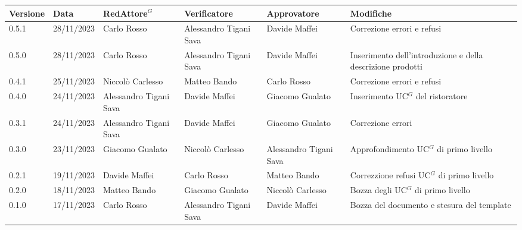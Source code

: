 \begin{table}[H]
	\centering
	\fontsize{10}{12}\selectfont
	\begin{tabularx}{\textwidth}{X|X|X|X|X|X}
		\textbf{Versione}     & \textbf{Data}        & \textbf{Red\gls{Attore}$^G$}     &
		\textbf{Verificatore} & \textbf{Approvatore} & \textbf{Modifiche}                                                                                                    \\
		\toprule
		0.5.1                 & 28/11/2023           & Carlo Rosso            & Alessandro Tigani Sava & Davide Maffei          & Correzione errori e refusi                                 \\
		\hline
		0.5.0                 & 28/11/2023           & Carlo Rosso            & Alessandro Tigani Sava & Davide Maffei          & Inserimento dell'introduzione e della descrizione prodotti \\
		\hline
		0.4.1                 & 25/11/2023           & Niccolò Carlesso       & Matteo Bando           & Carlo Rosso            & Correzione errori e refusi                 \\
		\hline
		0.4.0                 & 24/11/2023           & Alessandro Tigani Sava & Davide Maffei          & Giacomo Gualato        & Inserimento \gls{UC}$^G$ del ristoratore             \\
		\hline
		0.3.1                 & 24/11/2023           & Alessandro Tigani Sava & Davide Maffei          & Giacomo Gualato        & Correzione errori                          \\
		\hline
		0.3.0                 & 23/11/2023           & Giacomo Gualato        & Niccolò Carlesso       & Alessandro Tigani Sava & Approfondimento \gls{UC}$^G$ di primo livello        \\
		\hline
		0.2.1                 & 19/11/2023           & Davide Maffei          & Carlo Rosso            & Matteo Bando           & Correzzione refusi \gls{UC}$^G$ di primo livello     \\
		\hline
		0.2.0                 & 18/11/2023           & Matteo Bando           & Giacomo Gualato        & Niccolò Carlesso       & Bozza degli \gls{UC}$^G$ di primo livello            \\
		\hline
		0.1.0                 & 17/11/2023           & Carlo Rosso            & Alessandro Tigani Sava & Davide Maffei          & Bozza del documento e stesura del template \\
		\bottomrule
	\end{tabularx}
\end{table}